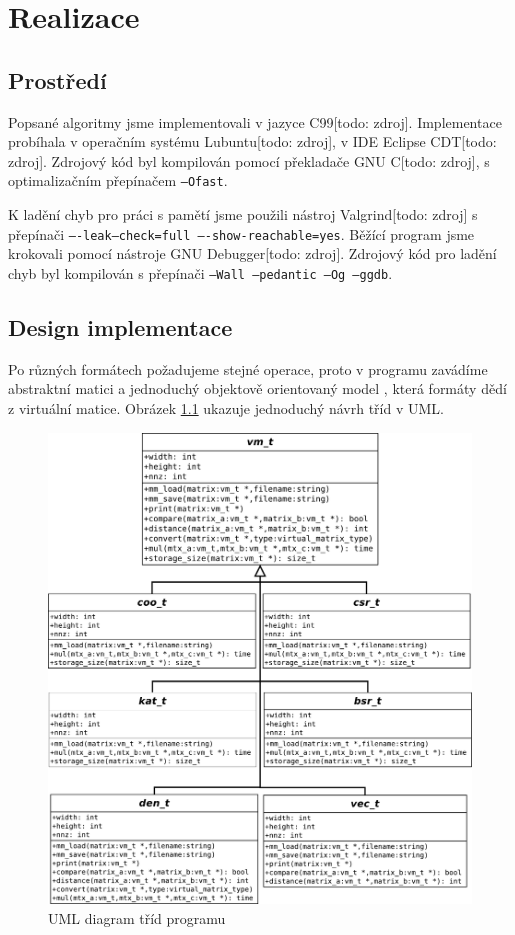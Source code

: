\chapter{Realizace}

\section{Prostředí}

Popsané algoritmy jsme implementovali v jazyce C99[todo: zdroj]. Implementace probíhala v operačním systému Lubuntu[todo: zdroj], v IDE Eclipse CDT[todo: zdroj]. Zdrojový kód byl kompilován pomocí překladače GNU C[todo: zdroj], s optimalizačním přepínačem \texttt{--Ofast}.

K ladění chyb pro práci s pamětí jsme použili nástroj Valgrind[todo: zdroj] s přepínači \texttt{----leak--check=full ----show-reachable=yes}. Běžící program jsme krokovali pomocí nástroje GNU Debugger[todo: zdroj]. Zdrojový kód pro ladění chyb byl kompilován s přepínači \texttt{--Wall --pedantic --Og --ggdb}.


\section{Design implementace}

Po různých formátech požadujeme stejné operace, proto v programu zavádíme abstraktní matici a jednoduchý objektově orientovaný model \cite{schreiner1994objektorientierte}, která formáty dědí z virtuální matice. Obrázek \ref{fig:uml} ukazuje jednoduchý návrh tříd v UML.
	
\begin{figure}[htb]
	\includegraphics[width=1.0\textwidth]{./images/uml/uml}
	\caption{UML diagram tříd programu}
	\label{fig:uml}
\end{figure}

